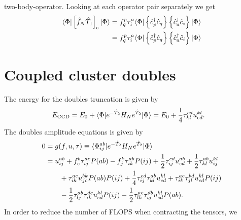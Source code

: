         two-body-operator.
        Looking at each operator pair separately we get
        \begin{align}
            \langle \Phi |\left[ 
                \hat{f}_N\hat{T}_1
             \right]_c| \Phi \rangle
            &=
            f^{p}_{q}\tau^{a}_{i}
            \langle \Phi |\left\{ 
                \hat{c}_{p}^{\dagger}\hat{c}_{q}
             \right\}\left\{ 
                \hat{c}_{a}^{\dagger}
                \hat{c}_{i}
             \right\}| \Phi \rangle
            \\
            &=
            f^{p}_{q}\tau^{a}_{i}
            \langle \Phi |\left\{ 
                \hat{c}_{p}^{\dagger}\hat{c}_{q}
             \right\}\left\{ 
                \hat{c}_{a}^{\dagger}
                \hat{c}_{i}
             \right\}| \Phi \rangle
        \end{align}

    \section{Coupled cluster doubles}
        The energy for the doubles truncation is given by
        \begin{align}
            E_{\text{CCD}}
            &= E_{0}
            + \langle \Phi | e^{-\hat{T}_2}H_N e^{\hat{T}_2}| \Phi \rangle
            = E_{0}
            + \frac{1}{4}\tau^{cd}_{kl} u^{kl}_{cd}.
        \end{align}
        The doubles amplitude equations is given by\cite{shavitt2009many}
        \begin{align}
            0 &= g(f, u, \tau)
            \equiv \langle \Phi^{ab}_{ij} |e^{-\hat{T}_2}H_N e^{\hat{T}_2}| \Phi \rangle
            \\
            &=
            u^{ab}_{ij}
            + f^{b}_{c} \tau^{ac}_{ij} P(ab)
            - f^{k}_{j} \tau^{ab}_{ik} P(ij)
            + \frac{1}{2} \tau^{cd}_{ij} u^{ab}_{cd}
            + \frac{1}{2} \tau^{ab}_{kl} u^{kl}_{ij}
            \nonumber \\
            &\qquad
            + \tau^{ac}_{ik} u^{bk}_{jc} P(ab) P(ij)
            + \frac{1}{4} \tau^{cd}_{ij} \tau^{ab}_{kl} u^{kl}_{cd}
            + \tau^{ac}_{ik} \tau^{bd}_{jl} u^{kl}_{cd} P(ij)
            \nonumber \\
            &\qquad
            - \frac{1}{2} \tau^{ab}_{lj} \tau^{dc}_{ik} u^{kl}_{cd} P(ij)
            - \frac{1}{2} \tau^{ac}_{lk} \tau^{db}_{ij} u^{kl}_{cd} P(ab).
        \end{align}
        In order to reduce the number of FLOPS when contracting the tensors, we
